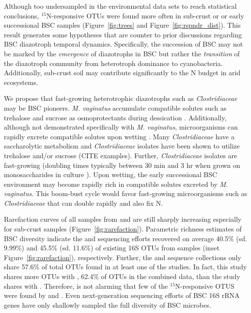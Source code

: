Although too undersampled in the environmental data sets to reach statistical
conclusions, $^{15}$N-responsive OTUs were found more often in sub-crust or
or early successional BSC samples (Figure~\ref{fig:trees} and
Figure~\ref{fig:rspndr_dist}).  This result generates some hypotheses that are
counter to prior discussions regarding BSC diazotroph temporal dynamics.
Specifically, the succession of BSC may not be marked by the \textit{emergence}
of diazotrophs in BSC but rather the \textit{transition} of the diazotroph
community from heterotroph dominance to cyanobacteria.  Additionally,
sub-crust soil may contribute significantly to the N budget in arid ecosystems.

We propose that fast-growing heterotrophic diazotrophs such as
\textit{Clostridiaceae} may be BSC pioneers. \textit{M. vaginatus}
accumulate compatible solutes such as trehalose and sucrose as osmoprotectants
during dessication \citep{Rajeev_2013}. Additionally, although not demonstrated specifically with \textit{M. vaginatus}, microorganisms can rapidly excrete 
compatible solutes upon wetting \citep{Poolman_1998}. Many \textit{Clostridiaceae} have a saccharolytic metabolism \citep{Wiegel_2006} and \textit{Clostridiaceae} isolates have been shown to utilize trehalose and/or sucrose (CITE examples). Further, \textit{Clostridiaceae} isolates are fast-growing (doubling times typically  between 30 min and 3 hr when grown on monosaccharides in culture \citep{Wiegel_2006}). Upon wetting, the early successional BSC environment may become rapidly rich in compatible solutes excreted by \textit{M. vaginatus}. This boom-bust cycle would favor fast-growing microorganisms such as \textit{Clostridiaceae} that can double
rapidly and also fix N.

Rarefaction curves of all samples from \citet{Steven_2013} and
\citet{Garcia_Pichel_2013} are still sharply increasing especially for
sub-crust samples (Figure~\ref{fig:rarefaction}). Parametric richness estimates
of BSC diversity indicate the \citet{Steven_2013} and
\citet{Garcia_Pichel_2013} sequencing efforts recovered on average 40.5\% (sd.
9.99\%) and 45.5\% (sd.  11.6\%) of existing 16S OTUs from samples (inset
Figure~\ref{fig:rarefaction}), respectively. Further, the \citet{Steven_2013}
and \citet{Garcia_Pichel_2013} sequence collections only share 57.6\% of total
OTUs found in at least one of the studies. In fact, this study shares more OTUs
with \citet{Steven_2013}, 62.4\% of OTUs in the combined data, than the
\citet{Steven_2013} study shares with \citet{Garcia_Pichel_2013}.  Therefore,
is not alarming that few of the $^{15}$N-responsive OTUS were found by
\citet{Garcia_Pichel_2013} and \citet{Steven_2013}. Even next-generation
sequencing efforts of BSC 16S rRNA genes have only shallowly sampled the full
diversity of BSC microbes.  

